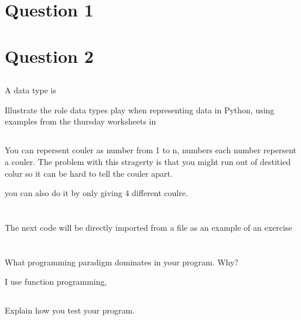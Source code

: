 \documentclass{article}
\begin{document}
\section{Question 1}


\section{Question 2}


\subsection{}
A data type is 

Illustrate the role data types play when representing data in Python, using examples from the thursday worksheets in 


\subsection{}

You can repersent couler as number from 1 to n, numbers each number repersent a couler. The problem with this stragerty is that you might run out of destitied colur so it can be hard to tell the couler apart.  


you can also do it by only giving 4 different coulre. 



\newpage

\section{}






The next code will be directly imported from a file as an example of an exercise








\section{}

\subsection{}


\subsection{}

What programming paradigm dominates in your program. Why?





I use function programming, 


\subsection{}

Explain how you test your program.


\section{}

\subsection{}
\end{document}
